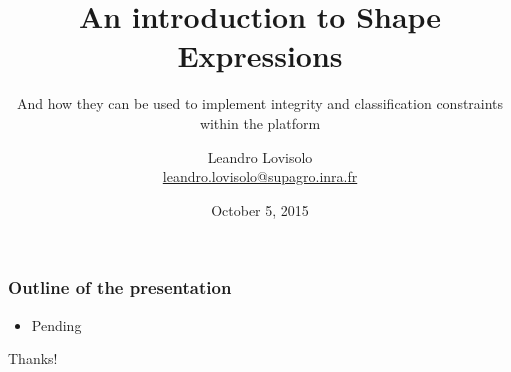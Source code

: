 \documentclass{beamer}
\title{An introduction to Shape Expressions}
\subtitle{
  And how they can be used to implement integrity and classification constraints
  within the \atweb platform
}
\author{
  Leandro Lovisolo \\
  \footnotesize{\href{mailto:leandro.lovisolo@supagro.inra.fr}
                     {leandro.lovisolo@supagro.inra.fr}}
}
\date{October 5, 2015}
\institute{
  INRA SupAgro and INRIA GraphiK \\
  Montpellier, France
}
\begin{document}
\begin{frame}
  \titlepage
\end{frame}

\begin{frame}
  \frametitle{Outline of the presentation}

  \begin{itemize}
    \item Pending
  \end{itemize}
\end{frame}

\begin{frame}
  \begin{center}
    \Huge{Thanks!}
  \end{center}
\end{frame}
\end{document}
